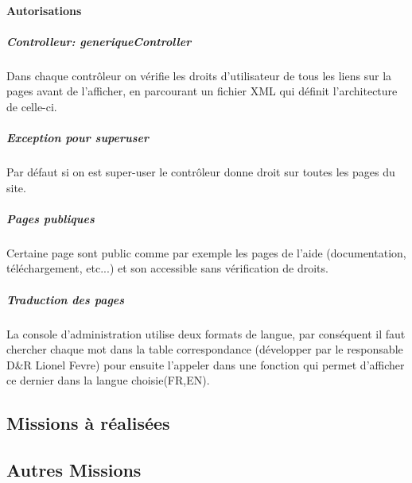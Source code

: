 \paragraph{Autorisations}
\subparagraph{Controlleur: generiqueController} 
Dans chaque contrôleur on vérifie les droits d’utilisateur de tous les liens sur la pages avant de l’afficher, en parcourant
un fichier XML qui définit l’architecture de celle-ci.
\subparagraph{Exception pour superuser}
Par défaut si on est super-user le contrôleur donne droit sur toutes les pages du site.
\subparagraph{Pages publiques} 
Certaine page sont public comme par exemple les pages de l'aide (documentation, téléchargement, etc...) et son
accessible sans vérification de droits.

\subparagraph{Traduction des pages}
La console d'administration utilise deux formats de langue, par conséquent il faut chercher chaque mot dans la table correspondance (développer par le responsable D\&R Lionel Fevre) pour ensuite l'appeler dans une fonction qui permet d'afficher ce dernier dans la langue choisie(FR,EN).

\subsection{Missions à réalisées}

\subsection{Autres Missions}




